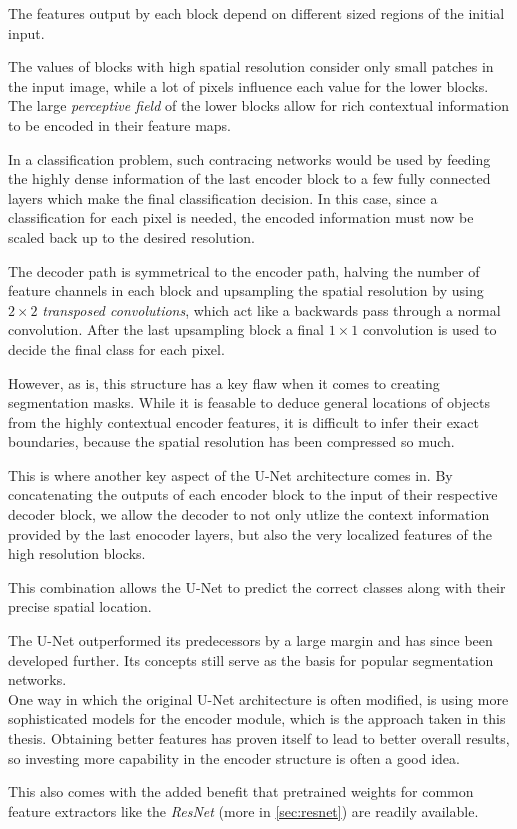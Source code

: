 The features output by each block depend on different sized regions of the initial input. 

The values of blocks with high spatial resolution consider only small patches in the input image, while a lot of pixels influence each value for the lower blocks. 
The large \emph{perceptive field} of the lower blocks allow for rich contextual information to be encoded in their feature maps.

In a classification problem, such contracing networks would be used by feeding the highly dense information of the last encoder block to a few fully connected layers which make the final classification decision. 
In this case, since a classification for each pixel is needed, the encoded information must now be scaled back up to the desired resolution.

The decoder path is symmetrical to the encoder path, halving the number of feature channels in each block and upsampling the spatial resolution by using $2\times 2$ \emph{transposed convolutions}, which act like a backwards pass through a normal convolution.
After the last upsampling block a final $1\times 1$ convolution is used to decide the final class for each pixel.

However, as is, this structure has a key flaw when it comes to creating segmentation masks. While it is feasable to deduce general locations of objects from the highly contextual encoder features, it is difficult to infer their exact boundaries, because the spatial resolution has been compressed so much. 

This is where another key aspect of the U-Net architecture comes in. 
By concatenating the outputs of each encoder block to the input of their respective decoder block, we allow the decoder to not only utlize the context information provided by the last enocoder layers, but also the very localized features of the high resolution blocks.

This combination allows the U-Net to predict the correct classes along with their precise spatial location.

The U-Net outperformed its predecessors by a large margin and has since been developed further. Its concepts still serve as the basis for popular segmentation networks.\\

One way in which the original U-Net architecture is often modified, is using more sophisticated models for the encoder module, which is the approach taken in this thesis. 
Obtaining better features has proven itself to lead to better overall results, so investing more capability in the encoder structure is often a good idea. 

This also comes with the added benefit that pretrained weights for common feature extractors like the \emph{ResNet} (more in \ref{sec:resnet}) are readily available. 
